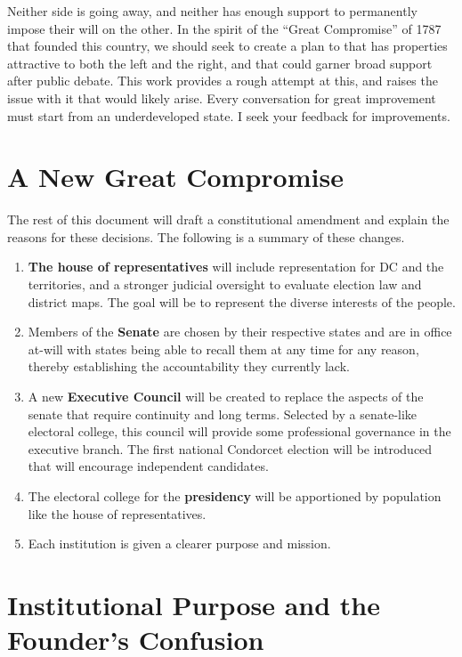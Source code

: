 \documentclass{article}
\begin{document}
Neither side is going away, and neither has enough support to permanently impose their will on the other. In the spirit of the “Great Compromise” of 1787 that founded this country, we should seek to create a plan to that has properties attractive to both the left and the right, and that could garner broad support after public debate. This work provides a rough attempt at this, and raises the issue with it that would likely arise. Every conversation for great improvement must start from an underdeveloped state. I seek your feedback for improvements.

\section{A New Great Compromise}

The rest of this document will draft a constitutional amendment and explain the reasons for these decisions. The following is a summary of these changes.\begin{enumerate}
  \item \textbf{The house of representatives} will include representation for DC and the territories, and a stronger judicial oversight to evaluate election law and district maps. The goal will be to represent the diverse interests of the people.
  \item Members of the \textbf{Senate} are chosen by their respective states and are in office at-will with states being able to recall them at any time for any reason, thereby establishing the accountability they currently lack.
  \item A new \textbf{Executive Council} will be created to replace the aspects of the senate that require continuity and long terms. Selected by a senate-like electoral college, this council will provide some professional governance in the executive branch. The first national Condorcet election will be introduced that will encourage independent candidates.
  \item The electoral college for the \textbf{presidency} will be apportioned by population like the house of representatives.
 \item Each institution is given a clearer purpose and mission.
\end{enumerate}

\section{Institutional Purpose and the Founder’s Confusion}
\end{document}
